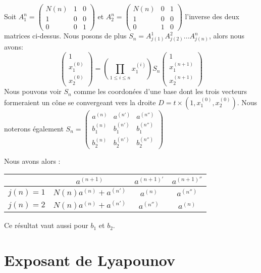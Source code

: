 \documentclass[12pt]{article}
\theoremstyle{plain}%
\theoremstyle{definition}
\theoremstyle{remark}
\begin{document}
Soit $A_1^n=\begin{pmatrix} N(n) & 1 & 0 \\1 & 0 & 0 \\0 & 0 & 1 \end{pmatrix}$ et $A_2^n=\begin{pmatrix} N(n) & 0 & 1 \\1 & 0 & 0 \\0 & 1 & 0 \end{pmatrix}$ l'inverse des deux matrices ci-dessus. Nous posons de plus $S_n=A_{j(1)}^1 A_{j(2)}^2 ... A_{j(n)}^n$, alors nous avons:$$
\begin{pmatrix} 1 \\ x_1^{(0)} \\ x_2^{(0)} \end{pmatrix} = (\prod_{1 \leq i \leq n} x_1^{(i)})S_n \begin{pmatrix} 1 \\ x_1^{(n+1)} \\ x_2^{(n+1)} \end{pmatrix}
$$
Nous pouvons voir $S_n$ comme les coordonées d'une base dont les trois vecteurs formeraient un cône se convergeant vers la droite $D=t \times (1,x_1^{(0)},x_2^{(0)})$. \newline
Nous noterons également $S_n=\begin{pmatrix} a^{(n)} & a^{(n')} & a^{(n'')} \\ b_1^{(n)} & b_1^{(n')} & b_1^{(n'')} \\ b_2^{(n)} & b_2^{(n')} & b_2^{(n'')} \end{pmatrix}$ \newline

Nous avons alors :

\begin{tabular}{c|c|c|c|}
  & $a^{(n+1)}$ & $a^{(n+1)'}$ & $a^{(n+1)''}$\\
\hline
$j(n)=1$ & $N(n)a^{(n)}+a^{(n')}$ & $a^{(n)}$ & $a^{(n'')}$ \\
$j(n)=2$ & $N(n)a^{(n)}+a^{(n')}$ & $a^{(n'')}$ & $a^{(n)}$ \\
\end{tabular}

Ce résultat vaut aussi pour $b_1$ et $b_2$.

\section{Exposant de Lyapounov}
\end{document}
